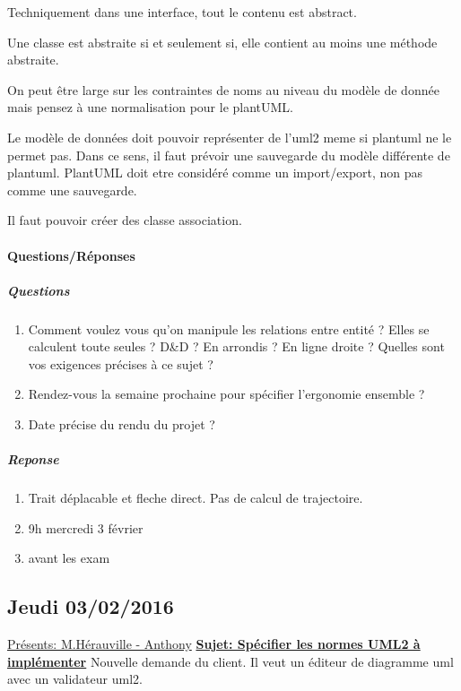\documentclass[a4paper,10pt]{article}
\begin{document}
Techniquement dans une interface, tout le contenu est abstract.

Une classe est abstraite si et seulement si, elle contient au moins une méthode abstraite.

On peut être large sur les contraintes de noms au niveau du modèle de donnée mais pensez à une normalisation pour le plantUML.

Le modèle de données doit pouvoir représenter de l'uml2 meme si plantuml ne le permet pas.
Dans ce sens, il faut prévoir une sauvegarde du modèle différente de plantuml. PlantUML doit etre considéré comme un import/export, non pas comme une sauvegarde.

Il faut pouvoir créer des classe association.

\paragraph{Questions/Réponses}
\subparagraph{Questions}
\begin{enumerate}
 \item Comment voulez vous qu'on manipule les relations entre entité ? Elles se calculent toute seules ? 
	D\&D ? En arrondis ? En ligne droite ? Quelles sont vos exigences précises à ce sujet ?
 \item Rendez-vous la semaine prochaine pour spécifier l'ergonomie ensemble ?
 \item Date précise du rendu du projet ?
\end{enumerate}

\subparagraph{Reponse}
\begin{enumerate}
 \item Trait déplacable et fleche direct. Pas de calcul de trajectoire.
 \item 9h mercredi 3 février
 \item avant les exam
\end{enumerate}


\subsection{Jeudi 03/02/2016}
\underline{Présents: M.Hérauville - Anthony}\newline
\textbf{\underline{Sujet: Spécifier les normes UML2 à implémenter}}\newline
Nouvelle demande du client. Il veut un éditeur de diagramme uml avec un validateur uml2.
\end{document}
